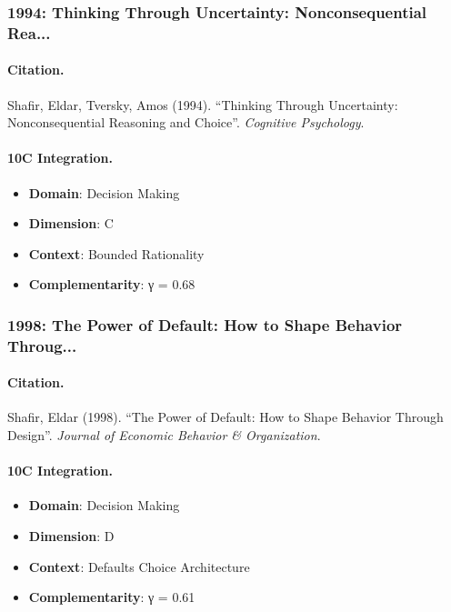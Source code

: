 \subsubsection{1994: Thinking Through Uncertainty: Nonconsequential Rea...}

\paragraph{Citation.}
Shafir, Eldar, Tversky, Amos (1994). ``Thinking Through Uncertainty: Nonconsequential Reasoning and Choice''. \textit{Cognitive Psychology}.

\paragraph{10C Integration.}
\begin{itemize}[nosep]
  \item \textbf{Domain}: Decision Making
  \item \textbf{Dimension}: C
  \item \textbf{Context}: Bounded Rationality
  \item \textbf{Complementarity}: γ = 0.68
\end{itemize}


\subsubsection{1998: The Power of Default: How to Shape Behavior Throug...}

\paragraph{Citation.}
Shafir, Eldar (1998). ``The Power of Default: How to Shape Behavior Through Design''. \textit{Journal of Economic Behavior & Organization}.

\paragraph{10C Integration.}
\begin{itemize}[nosep]
  \item \textbf{Domain}: Decision Making
  \item \textbf{Dimension}: D
  \item \textbf{Context}: Defaults Choice Architecture
  \item \textbf{Complementarity}: γ = 0.61
\end{itemize}


